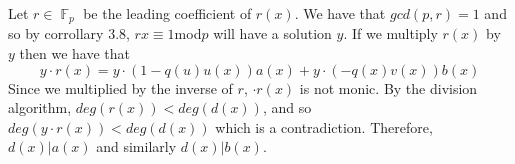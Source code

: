 \documentclass[letterpaper]{article}
\DeclareMathOperator{\F}{\mathbb{F}}
\begin{document}
Let $r\in \F_p$ be the leading coefficient of $r(x)$. We have that $gcd(p,r)=1$ and so by corrollary 3.8, $rx\equiv 1$mod$p$ will have a solution $y$. If we multiply $r(x)$ by $y$ then we have that $$y\cdot r(x) = y\cdot (1-q(u)u(x))a(x) + y\cdot (-q(x)v(x))b(x)$$
Since we multiplied by the inverse of $r$, $\cdot r(x) $ is not monic. By the division algorithm, $deg(r(x))<deg(d(x))$, and so $deg(y \cdot r(x))<deg(d(x))$ which is a contradiction. Therefore, $d(x)|a(x)$ and similarly $d(x)|b(x)$. 
\end{document}
